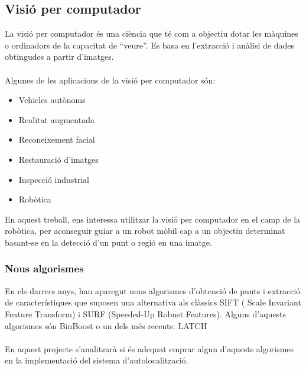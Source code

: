 	\subsection{Visió per computador}
		La visió per computador\cite{Szeliski} és una ciència que té com a objectiu dotar les màquines o ordinadors de la capacitat de ``veure''.
		Es basa en l'extracció i anàlisi de dades obtingudes a partir d'imatges.\\\\
		Algunes de les aplicacions de la visió per computador són:\\
		\begin{itemize}
			\item Vehicles autònoms
			\item Realitat augmentada
			\item Reconeixement facial
			\item Restauració d'imatges
			\item Inspecció industrial 
			\item Robòtica\\
		\end{itemize}
		En aquest treball, ens interessa utilitzar la visió per computador en el camp de la robòtica, per aconseguir guiar a un robot mòbil cap a un objectiu
		determinat basant-se en la detecció d'un punt o regió en una imatge.
		\subsubsection{Nous algorismes}
			En els darrers anys, han aparegut nous algorismes d'obtenció de punts i extracció de característiques que suposen una alternativa als clàssics SIFT\cite{SIFT}
			( Scale Invariant Feature Transform) i SURF\cite{SURF} (Speeded-Up Robust Features). Alguns d'aquests algorismes són BinBoost\cite{Trzcinski13a} o un dels més recents:
			LATCH\cite{LeviHassner2016LATCH}\\\\
			En aquest projecte s'analitzarà si és adequat emprar algun d'aquests algorismes en la implementació del sistema d'autolocalització. 
\newpage
